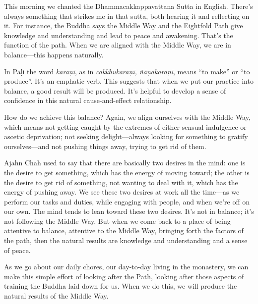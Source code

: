 This morning we chanted the Dhammacakkappavattana Sutta in English. 
There's always something that strikes me in that sutta, both hearing it 
and reflecting on it. For instance, the Buddha says the Middle Way and 
the Eightfold Path give knowledge and understanding and lead to peace 
and awakening. That's the function of the path. When we are aligned 
with the Middle Way, we are in balance---this happens naturally.

In Pāḷi the word \emph{karaṇī}, as in \emph{cakkhukaraṇī, 
ñāṇakaraṇī}, means ``to make'' or ``to produce''. It's an 
emphatic verb. This suggests that when we put our practice into 
balance, a good result will be produced. It's helpful to develop a 
sense of confidence in this natural cause-and-effect relationship.

How do we achieve this balance? Again, we align ourselves with the 
Middle Way, which means not getting caught by the extremes of either 
sensual indulgence or ascetic deprivation; not seeking delight---always 
looking for something to gratify ourselves---and not pushing things 
away, trying to get rid of them.

Ajahn Chah used to say that there are basically two desires in the 
mind: one is the desire to get something, which has the energy of 
moving toward; the other is the desire to get rid of something, not 
wanting to deal with it, which has the energy of pushing away. We see 
these two desires at work all the time---as we perform our tasks and 
duties, while engaging with people, and when we're off on our own. The 
mind tends to lean toward these two desires. It's not in balance; it's 
not following the Middle Way. But when we come back to a place of being 
attentive to balance, attentive to the Middle Way, bringing forth the 
factors of the path, then the natural results are knowledge and 
understanding and a sense of peace.

As we go about our daily chores, our day-to-day living in the 
monastery, we can make this simple effort of looking after the Path, 
looking after those aspects of training the Buddha laid down for us. 
When we do this, we will produce the natural results of the Middle Way.


